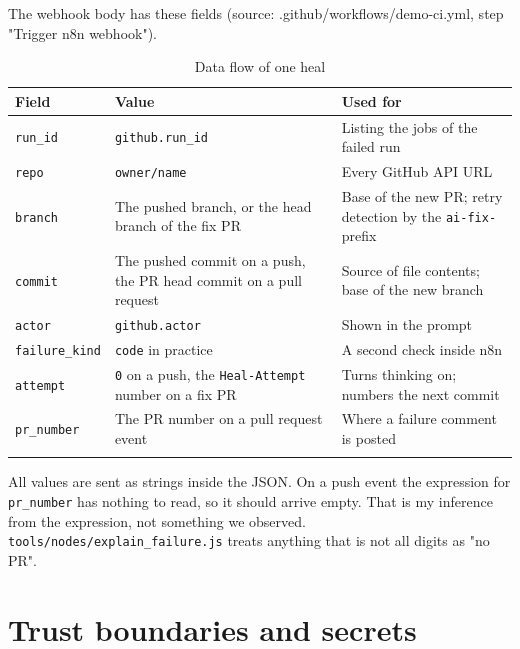 The webhook body has these fields (source: .github/\allowbreak{}workflows/\allowbreak{}demo-ci.yml, step "Trigger n8n webhook").

\begingroup\small
\begin{longtable}{>{\raggedright\arraybackslash}p{0.207\dimexpr\linewidth-6\tabcolsep\relax}>{\raggedright\arraybackslash}p{0.397\dimexpr\linewidth-6\tabcolsep\relax}>{\raggedright\arraybackslash}p{0.397\dimexpr\linewidth-6\tabcolsep\relax}}
\toprule
\rowcolor{gray!14}\textbf{Field} & \textbf{Value} & \textbf{Used for} \\
\midrule
\endhead
\bottomrule
\endfoot
\endlastfoot
\texttt{run\_\allowbreak{}id} & \texttt{github.\allowbreak{}run\_\allowbreak{}id} & Listing the jobs of the failed run \\
\texttt{repo} & \texttt{owner/\allowbreak{}name} & Every GitHub API URL \\
\texttt{branch} & The pushed branch, or the head branch of the fix PR & Base of the new PR; retry detection by the \texttt{ai-\allowbreak{}fix-\allowbreak{}} prefix \\
\texttt{commit} & The pushed commit on a push, the PR head commit on a pull request & Source of file contents; base of the new branch \\
\texttt{actor} & \texttt{github.\allowbreak{}actor} & Shown in the prompt \\
\texttt{failure\_\allowbreak{}kind} & \texttt{code} in practice & A second check inside n8n \\
\texttt{attempt} & \texttt{0} on a push, the \texttt{Heal-\allowbreak{}Attempt} number on a fix PR & Turns thinking on; numbers the next commit \\
\texttt{pr\_\allowbreak{}number} & The PR number on a pull request event & Where a failure comment is posted \\
\bottomrule
\caption{Data flow of one heal}\label{tab:04-2}\\
\end{longtable}
\endgroup

All values are sent as strings inside the JSON. On a push event the expression for \texttt{pr\_\allowbreak{}number} has nothing to read, so it should arrive empty. That is my inference from the expression, not something we observed. \texttt{tools/\allowbreak{}nodes/\allowbreak{}explain\_\allowbreak{}failure.\allowbreak{}js} treats anything that is not all digits as "no PR".

\section{Trust boundaries and secrets}

